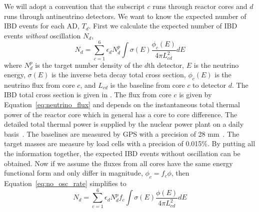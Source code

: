 We will adopt a convention that the subscript $c$ runs through reactor cores and $d$ runs through antineutrino detectors. We want to know the expected number of IBD events for each AD, $T_d$. First we calculate the expected number of IBD events \emph{without} oscillation $N_d$,
\begin{equation}\label{eq:no_osc_rate}
	N_d=\sum\limits_{c=1}^6 \epsilon_d N^p_d \int \sigma(E)\frac{\phi_c(E)}{4\pi L_{cd}^2}dE
\end{equation}
where $N^p_d$ is the target number density of the $d$th detector, $E$ is the neutrino energy, $\sigma(E)$ is the inverse beta decay total cross section, $\phi_c(E)$ is the neutrino flux from core $c$, and $L_{cd}$ is the baseline from core $c$ to detector $d$. The IBD total cross section is given in \cite{Vogel1999}. The flux from core $c$ is given by Equation~\ref{eq:neutrino_flux} and depends on the instantaneous total thermal power of the reactor core which in general has a core to core difference. The detailed total thermal power is supplied by the nuclear power plant on a daily basis~\cite{docdb7610}. The baselines are measured by GPS with a precision of 28 mm~\cite{dayabay2013}. The target masses are measure by load cells with a precision of 0.015$\%$. By putting all the information together, the expected IBD events without oscillation can be obtained. Now if we assume the fluxes from all cores have the same energy functional form and only differ in magnitude, $\phi_c=f_c\phi$, then Equation~\ref{eq:no_osc_rate} simplifies to
\begin{equation}\label{eq:no_osc_rate_simple}
	N_d=\sum\limits_{c=1}^6 \epsilon_d N^p_d f_c \int \sigma(E)\frac{\phi(E)}{4\pi L_{cd}^2}dE
\end{equation}

